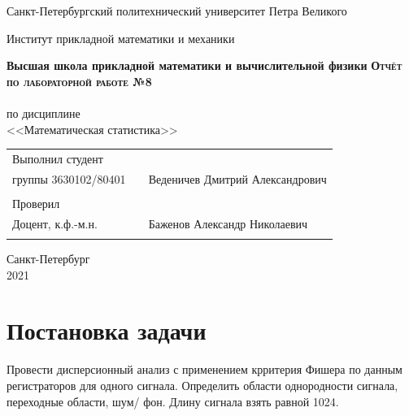 \documentclass{article}
\begin{document}
\begin{titlepage}
  \begin{center}
    \large
    Санкт-Петербургский политехнический университет Петра Великого
    
    Институт прикладной математики и механики
    
    \textbf{Высшая школа прикладной математики и вычислительной физики}
    \vfill
    \textsc{\textbf{\Large{Отчёт по лабораторной работе №8}}}\\[5mm]
    \\ по дисциплине
    \\ <<Математическая статистика>>\\
\end{center}

\vfill

\begin{tabular}{l p{} l}
Выполнил студент \\группы 3630102/80401 && Веденичев Дмитрий Александрович \\
\\
Проверил\\Доцент, к.ф.-м.н.& \hspace{0pt} &   Баженов Александр Николаевич \\\\
\end{tabular}

\hfill \break
\hfill \break
\begin{center} Санкт-Петербург \\2021 \end{center}
\thispagestyle{empty}
\end{titlepage}
\newpage
\newpage
\begin{center}
    \setcounter{page}{2}
    \tableofcontents
\end{center}
\newpage
\begin{center}
    \setcounter{page}{3}
    \listoffigures
\end{center}

\newpage

\section {Постановка задачи}
\noindent Провести дисперсионный анализ с применением крритерия Фишера по данным регистраторов для одного сигнала. Определить области однородности сигнала, переходные области, шум/ фон. Длину сигнала взять равной 1024.
\end{document}
